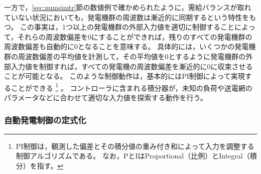 \documentclass[tombow,dvipdfmx]{corona-a5-1.1}
\begin{document}
一方で，\ref{sec:numsimtr}節の数値例で確かめられたように，需給バランスが取れていない状況においても，発電機群の周波数は漸近的に同期するという特性をもつ。
この事実は，1つ以上の発電機群の外部入力値を適切に制御することによって，それらの周波数偏差を0にすることができれば，残りのすべての発電機群の周波数偏差も自動的に0となることを意味する。
具体的には，いくつかの発電機群の周波数偏差の平均値を計測して，その平均値を0とするように発電機群の外部入力値を制御すれば，すべての発電機の周波数偏差を漸近的に0に収束させることが可能となる。
このような制御動作は，基本的にはPI制御によって実現することができる
\footnote{
PI制御は，観測した偏差とその積分値の重み付き和によって入力を調整する制御アルゴリズムである。
なお，PとIはProportional（比例）とIntegral（積分）を指す。
}
。
コントローラに含まれる積分器が，未知の負荷や送電網のパラメータなどに合わせて適切な入力値を探索する動作を行う。

\subsubsection{自動発電制御の定式化}
\end{document}
